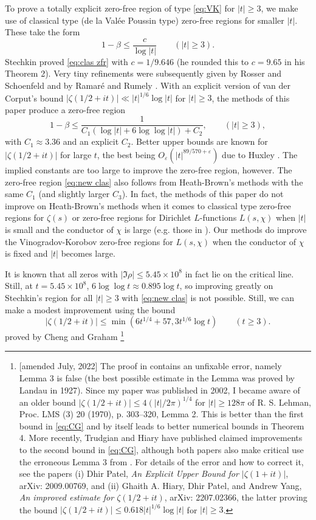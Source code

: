 \documentclass[10pt]{amsart}
\theoremstyle{remark}
\theoremstyle{plain}
\numberwithin{equation}{section}
\theoremstyle{definition}
\def\({\left(}
\def\){\right)}
\def\eps{\varepsilon}
\newcommand{\be}{\begin{equation}}
\newcommand{\rev}[1]{{\color{red}#1}}
\begin{document}
To prove a totally explicit zero-free region of type \eqref{eq:VK}
 for $|t|\ge 3$, we make use of
classical type (de la Val\'ee Poussin type) zero-free regions
 for smaller $|t|$. These take the form
\be
1-\beta \le \frac{c}{\log |t|} \qquad (|t| \ge 3). \label{eq:clas zfr}
\end{equation}
Stechkin \cite{S} proved \eqref{eq:clas zfr} with $c=1/9.646$ 
(he rounded this to $c=9.65$ in his Theorem 2).
Very tiny refinements were subsequently given by
Rosser and Schoenfeld \cite{RS2} and by Ramar\'e and Rumely \cite{RR}.
With an explicit version of van der Corput's bound
$|\zeta(1/2+it)| \ll |t|^{1/6}\log |t|$ for $|t|\ge 3$,
the methods of this paper produce a zero-free region
\be
1-\beta \le \frac{1}{C_1(\log |t|+6\log\log|t|)+C_2}, \qquad (|t| \ge 3),
\label{eq:new clas}
\end{equation}
with $C_1\approx 3.36$ and an explicit $C_2$.
Better upper bounds are known for $|\zeta(1/2+it)|$ for large $t$,
the best being $O_\eps(|t|^{89/570+\eps})$ due to Huxley \cite{H}.
The implied constants are too large to improve the zero-free region,
however.
The zero-free region \eqref{eq:new clas}
also follows from Heath-Brown's methods with the same $C_1$ (and slightly
larger $C_3$).  In fact,
the methods of this paper do not improve on Heath-Brown's methods when it comes
to classical type zero-free regions for $\zeta(s)$ or zero-free regions
for Dirichlet $L$-functions $L(s,\chi)$ when $|t|$ is small and the
conductor of $\chi$ is large (e.g. those in \cite{HB2}).  Our methods do
improve the Vinogradov-Korobov zero-free regions for $L(s,\chi)$ when the
conductor of $\chi$ is fixed and $|t|$ becomes large.

It is known \cite{LRW} that all zeros with $|\Im \rho| \le
5.45 \times 10^8$ in fact lie on the critical line.  Still, at $t=5.45\times
10^8$, $6\log\log t \approx 0.895\log t$, so improving greatly on
Stechkin's region for all $|t|\ge 3$ with \eqref{eq:new clas} is
not possible.  Still, we can make a modest improvement using the bound
\be
|\zeta(1/2+it)| \le \min\( 6t^{1/4}+57, 3t^{1/6}\log t \) \qquad (t\ge 3).
\label{eq:CG}
\end{equation}
proved by Cheng and Graham \cite{CG}
\footnote{\rev{[amended July, 2022] The proof in \cite{CG} contains an unfixable error, namely Lemma 3 is
  false (the best possible estimate in the Lemma was proved by Landau in 1927).
  Since my paper was published in 2002, I became aware of
  an older bound $|\zeta(1/2+it)| \le 4(|t|/2\pi)^{1/4}$ for $|t| \ge 128\pi$
  of R. S. Lehman, Proc. LMS (3) 20 (1970), p. 303--320, Lemma 2.
  This is better than
  the first bound in \eqref{eq:CG} and by itself leads to better numerical bounds in Theorem 4.  More recently,
  Trudgian and Hiary have published claimed improvements to the second bound in \eqref{eq:CG},
  although both papers also make critical use the
  erroneous Lemma 3 from \cite{CG}.   For details of the error and
  how to correct it, see the papers (i)
   Dhir Patel, \emph{An Explicit Upper Bound for $|\zeta(1+it)|$},
  arXiv: 2009.00769, and (ii)
Ghaith A. Hiary, Dhir Patel, and Andrew Yang, 
\emph{An improved  estimate for $\zeta(1/2+it)$},
arXiv: 2207.02366, the latter proving the bound
$|\zeta(1/2+it)| \le 0.618 |t|^{1/6}\log |t|$ for $|t| \ge 3$.}}
\end{document}
